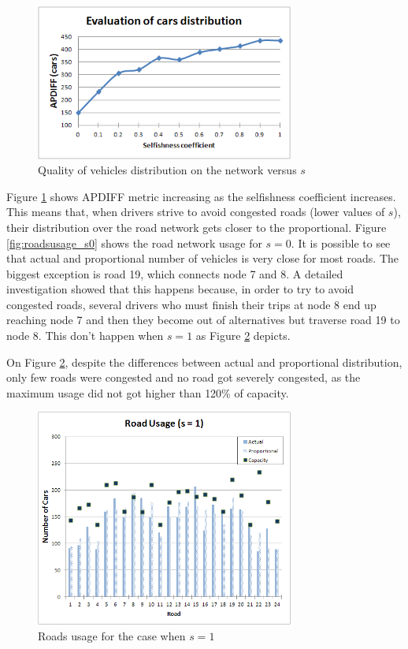 \documentclass[12pt]{article}
\begin{document}
\begin{figure}[ht]
    \centerline{\includegraphics[width=8.5cm]{img/carsDistribVersusS.png}}
    \caption{Quality of vehicles distribution on the network versus $s$}
    \label{fig:apdiff}
\end{figure}

Figure \ref{fig:apdiff} shows APDIFF metric increasing as the selfishness coefficient increases. This means that, when drivers strive to avoid congested roads (lower values of $s$), their distribution over the road network gets closer to the proportional. Figure \ref{fig:roadsusage_s0} shows the road network usage for $s = 0$. It is possible to see that actual and proportional number of vehicles is very close for most roads. The biggest exception is road 19, which connects node 7 and 8. A detailed investigation showed that this happens because, in order to try to avoid congested roads, several drivers who must finish their trips at node 8 end up reaching node 7 and then they become out of alternatives but traverse road 19 to node 8. This don't happen when $s=1$ as Figure \ref{fig:roadsusage} depicts. 

On Figure \ref{fig:roadsusage}, despite the differences between actual and proportional distribution, only few roads were congested and no road got severely congested, as the maximum usage did not got higher than 120\% of capacity.

\begin{figure}[ht]
    \centerline{\includegraphics[width=8.5cm]{img/roadsUsage.png}}
    \caption{Roads usage for the case when $s=1$}
    \label{fig:roadsusage}

\end{figure}
\end{document}
